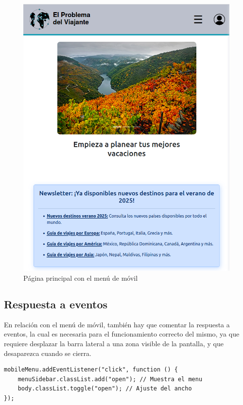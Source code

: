 \documentclass[11pt, a4paper]{book}
\begin{document}
	\begin{figure} [H]
		\centering
		\includegraphics[height=0.4\textheight]{CSS/1-5 768.png}
		\caption{Página principal con el menú de móvil}
	\end{figure}

	\subsection{Respuesta a eventos}

	En relación con el menú de móvil, también hay que comentar la respuesta a eventos, la cual es necesaria para el funcionamiento correcto del mismo, ya que requiere desplazar la barra lateral a una zona visible de la pantalla, y que desaparezca cuando se cierra.
	
	\begin{lstlisting}
mobileMenu.addEventListener("click", function () {
	menuSidebar.classList.add("open"); // Muestra el menu
	body.classList.toggle("open"); // Ajuste del ancho
});
	\end{lstlisting} 
\end{document}
